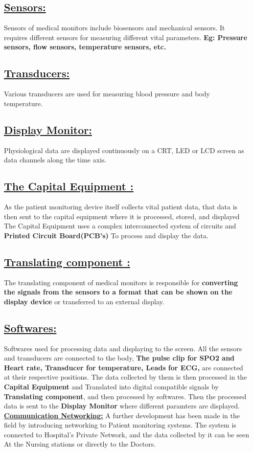 \documentclass[12pt, monotype corsiva]{article}
\begin{document}
\subsection{\underline{Sensors:}}
Sensors of medical monitors include biosensors and mechanical sensors.
It requires different sensors for measuring different vital parameters.
\textbf{Eg: Pressure sensors, flow sensors, temperature sensors, etc.}
\subsection{\underline{Transducers:}}
Various transducers are used for measuring blood pressure and body temperature.
\subsection{\underline{Display Monitor:}}
Physiological data are displayed continuously on a CRT, LED or LCD screen as data channels along the time axis.
\subsection{\underline{The Capital Equipment :}}
As the patient monitoring device itself collects vital patient data, that data is then sent to the capital equipment where it is processed, stored, and displayed  The Capital Equipment uses a complex interconnected system of circuits and \textbf{Printed Circuit Board(PCB's)} To process and display the data.
\subsection{\underline{Translating component :}}
The translating component of medical monitors is responsible for \textbf{converting the signals from the sensors to a format that can be shown on the display device} or transferred to an external display.
\subsection{\underline{Softwares:}}
Softwares used for processing data and displaying to the screen.
\newline
\newline All the sensors and transducers are connected to the body, \textbf{The pulse clip for SPO2 and Heart rate, Transducer for temperature, Leads for ECG,} are connected at their respective positions. The data collected by them is then processed in the \textbf{Capital Equipment} and Translated into digital compatible signals by \textbf{Translating component}, and then processed by softwares. Then the processed data is sent to the \textbf{Display Monitor} where different paramters are displayed. 
\newline
\newline \textbf{\underline{Communication Networking:}} A further development has been made in the field by introducing networking to Patient monitoring systems. The system is connected to Hospital's Private Network, and the data collected by it can be seen At the Nursing stations or directly to the Doctors. 
\end{document}
